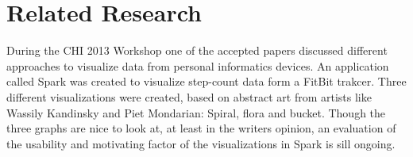\section{Related Research}
During the CHI 2013 Workshop \cite{chi2013} one of the accepted papers discussed different approaches to visualize data from personal informatics devices. %
An application called Spark was created to visualize step-count data form a FitBit trakcer. %
Three different visualizations were created, based on abstract art from artists like Wassily Kandinsky and Piet Mondarian: Spiral, flora and bucket. %
Though the three graphs are nice to look at, at least in the writers opinion, an evaluation of the usability and motivating factor of the visualizations in Spark is sill ongoing. 
